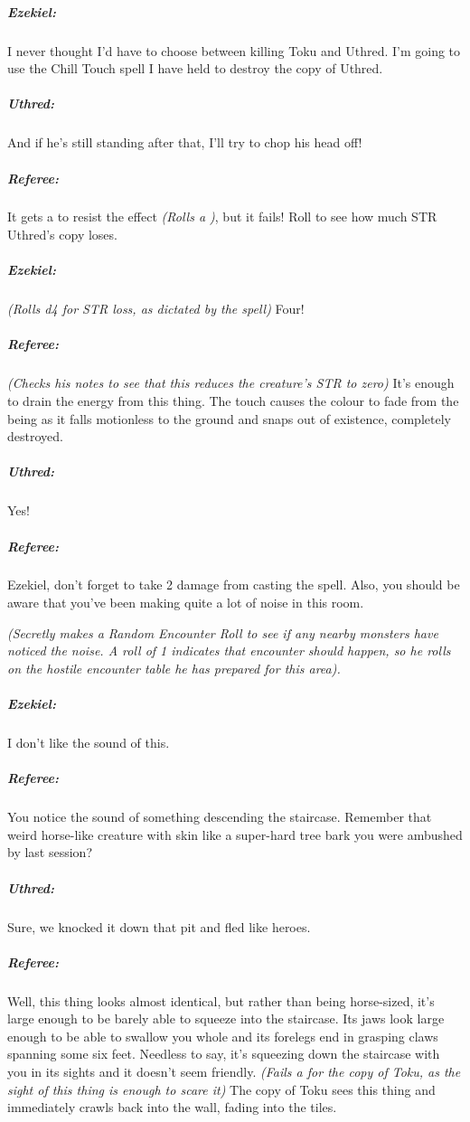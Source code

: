 \documentclass[itdr]{subfiles}
\begin{document}
{\subparagraph{Ezekiel:} I never thought I'd have to choose between killing Toku and Uthred. I'm going to use the Chill Touch spell I have held to destroy the copy of Uthred.

\subparagraph{Uthred:} And if he's still standing after that, I'll try to chop his head off!

\subparagraph{Referee:} It gets a  to resist the effect {\em (Rolls a )}, but it fails! Roll to see how much STR Uthred's copy loses.

\subparagraph{Ezekiel:} {\em (Rolls d4 for STR loss, as dictated by the
spell)} Four!

\subparagraph{Referee:} {\em (Checks his notes to see that this reduces the creature's STR to zero)} It's enough to drain the energy from this thing. The touch causes the colour to fade from the being as it falls motionless to the ground and snaps out of existence, completely destroyed.

\subparagraph{Uthred:} Yes!

\subparagraph{Referee:} Ezekiel, don't forget to take 2 damage from casting the spell. Also, you should be aware that you've been making quite a lot of noise in this room.

{\em (Secretly makes a Random Encounter Roll to see if any nearby monsters have noticed the noise. A roll of 1 indicates that encounter should happen, so he rolls on the hostile encounter table he has prepared for this area).}

\subparagraph{Ezekiel:} I don't like the sound of this.

\subparagraph{Referee:} You notice the sound of something descending the staircase. Remember that weird horse-like creature with skin like a super-hard tree bark you were ambushed by last session?

\subparagraph{Uthred:} Sure, we knocked it down that pit and fled like heroes.

\subparagraph{Referee:} Well, this thing looks almost identical, but rather than being horse-sized, it's large enough to be barely able to squeeze into the staircase. Its jaws look large enough to be able to swallow you whole and its forelegs end in grasping claws spanning some six feet. Needless to say, it's squeezing down the staircase with you in its sights and it doesn't seem friendly. {\em (Fails a  for the copy of Toku, as the sight of this thing is enough to scare it)} The copy of Toku sees this thing and immediately crawls back into the wall, fading into the tiles.

}
\end{document}
